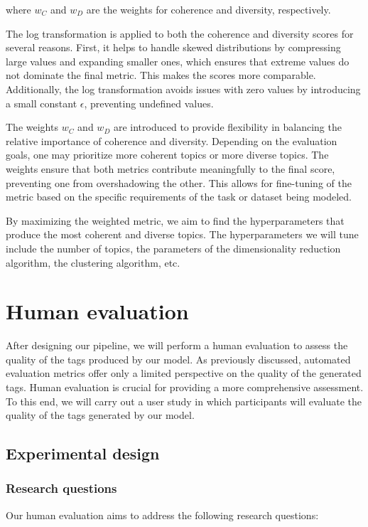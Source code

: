 where \( w_C \) and \( w_D \) are the weights for coherence and diversity, respectively.

The log transformation is applied to both the coherence and diversity scores for several reasons. First, it helps to handle skewed distributions by compressing large values and expanding smaller ones, which ensures that extreme values do not dominate the final metric. This makes the scores more comparable. Additionally, the log transformation avoids issues with zero values by introducing a small constant \( \epsilon \), preventing undefined values.

The weights \( w_C \) and \( w_D \) are introduced to provide flexibility in balancing the relative importance of coherence and diversity. Depending on the evaluation goals, one may prioritize more coherent topics or more diverse topics. The weights ensure that both metrics contribute meaningfully to the final score, preventing one from overshadowing the other. This allows for fine-tuning of the metric based on the specific requirements of the task or dataset being modeled.

By maximizing the weighted metric, we aim to find the hyperparameters that produce the most coherent and diverse topics. The hyperparameters we will tune include the number of topics, the parameters of the dimensionality reduction algorithm, the clustering algorithm, etc.

\section{Human evaluation}
After designing our pipeline, we will perform a human evaluation to assess the quality of the tags produced by our model. As previously discussed, automated evaluation metrics offer only a limited perspective on the quality of the generated tags. Human evaluation is crucial for providing a more comprehensive assessment. To this end, we will carry out a user study in which participants will evaluate the quality of the tags generated by our model.

\subsection{Experimental design}
\subsubsection{Research questions}
Our human evaluation aims to address the following research questions:

